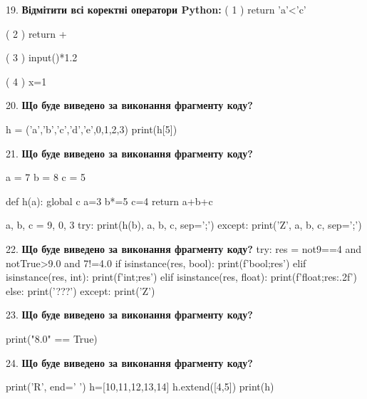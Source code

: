 \documentclass[11pt]{article}
\begin{document}
\par\vspace{5mm}

19. %
\textbf{Відмітити всі коректні оператори Python:}
( 1 ) return 'a'<'c'

( 2 ) return +

( 3 ) input()*1.2

( 4 ) x=1%
\par\vspace{5mm}

20. \textbf{Що буде виведено за виконання фрагменту коду?}

h = ('a','b','c','d','e',0,1,2,3)
print(h[5])

\par\vspace{5mm}

21. \textbf{Що буде виведено за виконання фрагменту коду?}

a = 7
b = 8
c = 5

def h(a):
global c    a=3
    b*=5
    c=4
    return a+b+c

a, b, c = 9, 0, 3
try:
    print(h(b), a, b, c, sep=';')
except:
    print('Z', a, b, c, sep=';')
\par\vspace{5mm}

22. \textbf{Що буде виведено за виконання фрагменту коду?}
try:
    res = not9==4 and notTrue>9.0 and 7!=4.0
    if isinstance(res, bool):
        print(f'bool;{res}')
    elif isinstance(res, int):
        print(f'int;{res}')
    elif isinstance(res, float):
        print(f'float;{res:.2f}')
    else:
        print('???')
except:
    print('Z')
\par\vspace{5mm}

23. \textbf{Що буде виведено за виконання фрагменту коду?}

print("8.0" == True)
\par\vspace{5mm}

24. \textbf{Що буде виведено за виконання фрагменту коду?}

print('R', end=' ')
h=[10,11,12,13,14]
h.extend([4,5])
print(h)

\par\vspace{5mm}
\end{document}
